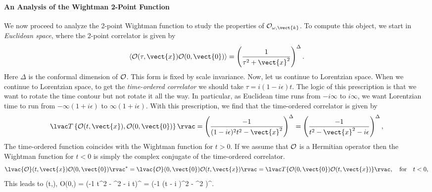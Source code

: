 \paragraph{An Analysis of the Wightman 2-Point Function}
We now proceed to analyze the 2-point Wightman function to study the properties of ${\cal O}_{\omega,\vect{k}}$. To compute this object, we start in {\em Euclidean space}, where the 2-point correlator is given by
\[
\langle {\cal O}(\tau, \vect{x}) {\cal O}(0,\vect{0}) \rangle = \left({1 \over \tau^2 + \vect{x}^2}\right)^{\Delta}.
 \]
Here $\Delta$ is the conformal dimension of ${\cal O}$. This form is fixed by scale invariance. 
Now, let us continue to Lorentzian space. When we continue to Lorentzian space, to get the {\em time-ordered correlator} we should take $\tau = i (1 - i \epsilon) t$.  The logic of this prescription is that we want to rotate the time contour but not rotate it all the way. In particular, as Euclidean time runs from $-i \infty$ to $i \infty$, we want
Lorentzian time to run from $-\infty (1 + i \epsilon)$ to $\infty(1 + i \epsilon)$. With this prescription, we find that the time-ordered correlator is given by
\[
\lvac T\left\{{\cal O}(t,\vect{x}), {\cal O}(0,\vect{0}) \right\} \rvac = \left({-1 \over  (1 - i \epsilon)^2 t^2-\vect{x}^2} \right)^{\Delta}  = \left({-1 \over t^2 - \vect{x}^2 - i \epsilon}\right)^{\Delta},
 \]
The time-ordered function coincides with the Wightman function for $t > 0$.  If we assume that ${\cal O}$ is a Hermitian operator then the Wightman function for $t < 0$ is simply the complex conjugate of the time-ordered correlator. 
\[
\lvac {\cal O}(t,\vect{x}) {\cal O}(0,\vect{0}) \rvac^* = \lvac {\cal O}(0,\vect{0}) {\cal O}(t,\vect{x}) \rvac = \lvac T\{{\cal O}(0,\vect{0}) {\cal O}(t,\vect{x}) \} \rvac, \quad \text{for} \quad t < 0,
 \]
This leads to
\be
\label{wightmanfuncvacuum}
(t,), {\cal O}(0,) \rvac  = \left({-1 \over t^2 - ^2 - i \epsilon t}\right)^{\Delta} = \left({-1 \over (t - i \epsilon)^2 - ^2} \right)^{\Delta}.
\ee

